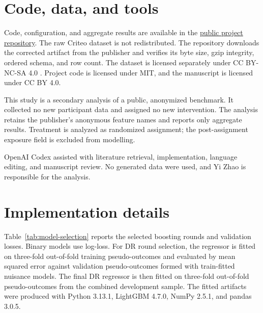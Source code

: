 \documentclass[11pt]{article}
\begin{document}
\section*{Code, data, and tools}

Code, configuration, and aggregate results are available in the
\href{https://github.com/felixxaxs12/budget-constrained-uplift-modelling-and-causal-policy-optimization}{public project repository}.
The raw Criteo dataset is not redistributed. The repository downloads the corrected artifact from the publisher and verifies its byte size, gzip integrity, ordered schema, and row count. The dataset is licensed separately under CC BY-NC-SA 4.0 \citep{criteoDataset}. Project code is licensed under MIT, and the manuscript is licensed under CC BY 4.0.

This study is a secondary analysis of a public, anonymized benchmark. It collected no new participant data and assigned no new intervention. The analysis retains the publisher's anonymous feature names and reports only aggregate results. Treatment is analyzed as randomized assignment; the post-assignment exposure field is excluded from modelling.

OpenAI Codex assisted with literature retrieval, implementation, language editing, and manuscript review. No generated data were used, and Yi Zhao is responsible for the analysis.

\appendix

\section{Implementation details}

Table~\ref{tab:model-selection} reports the selected boosting rounds and validation losses. Binary models use log-loss. For DR round selection, the regressor is fitted on three-fold out-of-fold training pseudo-outcomes and evaluated by mean squared error against validation pseudo-outcomes formed with train-fitted nuisance models. The final DR regressor is then fitted on three-fold out-of-fold pseudo-outcomes from the combined development sample. The fitted artifacts were produced with Python 3.13.1, LightGBM 4.7.0, NumPy 2.5.1, and pandas 3.0.5.

\begin{table}[htbp]
\centering
\caption{Model selection recorded before held-out outcome evaluation.}
\label{tab:model-selection}

\end{table}
\end{document}
